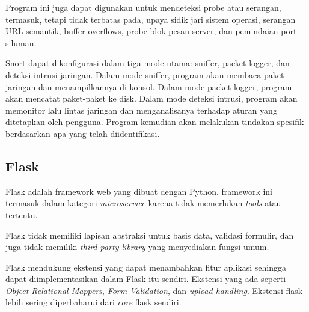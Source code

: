 \documentclass[./skripsi.tex]{subfiles}
\begin{document}
Program ini juga dapat digunakan untuk mendeteksi probe atau serangan, termasuk, tetapi tidak terbatas pada, upaya sidik jari sistem operasi, serangan URL semantik, buffer overflows, probe blok pesan server, dan pemindaian port siluman. \cite{stanger2011cheat}

Snort dapat dikonfigurasi dalam tiga mode utama: sniffer, packet logger, dan deteksi intrusi jaringan. Dalam mode sniffer, program akan membaca paket jaringan dan menampilkannya di konsol. Dalam mode packet logger, program akan mencatat paket-paket ke disk. Dalam mode deteksi intrusi, program akan memonitor lalu lintas jaringan dan menganalisanya terhadap aturan yang ditetapkan oleh pengguna. Program kemudian akan melakukan tindakan spesifik berdasarkan apa yang telah diidentifikasi.
\subsection{Flask}
\par Flask adalah framework web yang dibuat dengan Python. framework ini termasuk dalam kategori \textit{microservice} karena tidak memerlukan \textit{tools} atau  tertentu.
\par Flask tidak memiliki lapisan abstraksi untuk basis data, validasi formulir, dan juga tidak memiliki \textit{third-party library} yang menyediakan fungsi umum. 
\par Flask mendukung ekstensi yang dapat menambahkan fitur aplikasi sehingga dapat diimplementasikan dalam Flask itu sendiri. Ekstensi yang ada seperti \textit{Object Relational Mappers}, \textit{Form Validation}, dan \textit{upload handling}. Ekstensi flask lebih sering diperbaharui dari \textit{core} flask sendiri.
\end{document}
